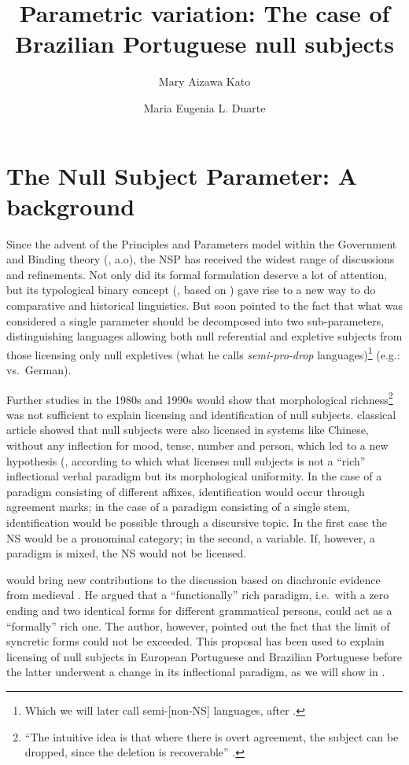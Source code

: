 \documentclass[output=paper]{langsci/langscibook}
\author{Mary Aizawa Kato\affiliation{Universidade Estadual de Campinas}\and
Maria Eugenia L. Duarte\affiliation{Universidade Federal do Rio de Janeiro}}
\title{Parametric variation: The case of Brazilian Portuguese null subjects}
\begin{document}
\glsresetall

\section{The Null Subject Parameter: A background}

Since the advent of the Principles and Parameters model within the Government
and Binding theory (\citealt{Chomsky1981,Rizzi:1982}, a.o), the \gls{NSP} has
received the widest range of discussions and refinements.  Not only did its
formal formulation deserve a lot of attention, but its typological binary
concept (\citealt{Chomsky1981}, based on \citealt{Taraldsen1978}) gave rise to
a new way to do comparative and historical linguistics.  But
\citet[144]{Rizzi:1982} soon pointed to the fact that what was considered a
single parameter should be decomposed into two sub-parameters, distinguishing
languages allowing both null referential and expletive subjects from those
licensing only null expletives (what he calls \emph{semi-pro-drop}
languages)\footnote{Which we will later call semi-[non-NS] languages, after
\citet{Biberauer2010}.} (e.g.:  vs.\ German).

Further studies in the 1980s and 1990s would show that morphological
richness\footnote{“The intuitive idea is that where there is overt agreement,
the subject can be dropped, since the deletion is recoverable”
\parencite[241]{Chomsky1981}.} was not sufficient to explain licensing and
identification of null subjects.  classical article showed
that null subjects were also licensed in systems like Chinese, without any
inflection for mood, tense, number and person, which led to a new hypothesis
(\citet{JaeggliSafir1989}, according to which what licenses null subjects is
not a “rich” inflectional verbal paradigm but its morphological uniformity.  In
the case of a paradigm consisting of different affixes, identification would
occur through agreement marks; in the case of a paradigm consisting of a single
stem, identification would be possible through a discursive topic. In the first
case the NS would be a pronominal category; in the second, a variable. If,
however, a paradigm is mixed, the NS would not be licensed.

\citet{Roberts1993} would bring new contributions to the discussion based on
diachronic evidence from medieval . He argued that a “functionally” rich
paradigm, i.e.\ with a zero ending and two identical forms for different
grammatical persons, could act as a “formally” rich one. The author, however,
pointed out the fact that the limit of syncretic forms could not be
exceeded. This proposal has been used to explain licensing of null subjects in
European Portuguese and Brazilian Portuguese before the latter underwent a
change in its inflectional paradigm, as we will show in .
\end{document}
